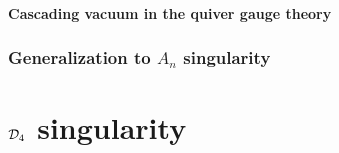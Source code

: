     \subsection{Cascading vacuum in the quiver gauge theory}



\section{Generalization to $A_n$ singularity}

\part{$\mathcal{D}_4$ singularity}